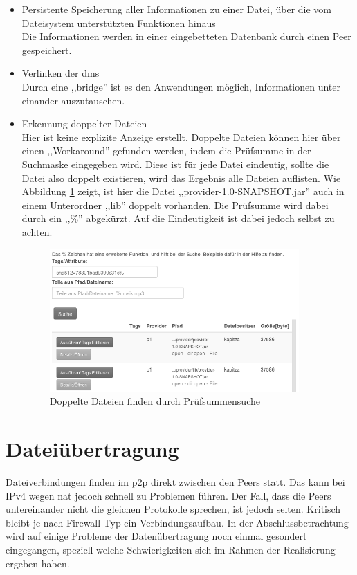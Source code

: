 \documentclass[oneside, ngerman, toc=bibliography,bibliography=totoc,listof=entryprefix, open=right,numbers=noenddot,fontsize=12pt]{scrbook}
\begin{document}
\begin{itemize}
         
      \item Persistente Speicherung aller Informationen zu einer Datei, über die vom Dateisystem unterstützten Funktionen hinaus\\
      Die Informationen werden in einer eingebetteten Datenbank durch einen Peer gespeichert.
    \item Verlinken der \acrshort{dms}\\
    Durch eine ,,bridge'' ist es den Anwendungen möglich, Informationen unter einander auszutauschen. 
    \item Erkennung doppelter Dateien\\
    Hier ist keine explizite Anzeige erstellt. Doppelte Dateien können hier über einen ,,Workaround'' gefunden werden, indem die Prüfsumme in der Suchmaske eingegeben wird. Diese ist für jede Datei eindeutig, sollte die Datei also doppelt existieren, wird das Ergebnis alle Dateien auflisten. Wie Abbildung \ref{fig:app-dups} zeigt, ist hier die Datei ,,provider-1.0-SNAPSHOT.jar'' auch in einem Unterordner ,,lib'' doppelt vorhanden. Die Prüfsumme wird dabei durch ein ,,\%'' abgekürzt. Auf die Eindeutigkeit ist dabei jedoch selbst zu achten. 
    
    \begin{figure}[htbp] 
        \centering
        \includegraphics[width=0.9\textwidth]{Masterarbeit_Bilder/suchedups.png}
        \caption{Doppelte Dateien finden durch Prüfsummensuche}
        \label{fig:app-dups}
    \end{figure}  
    
    
    
\end{itemize}



\section{Dateiübertragung}
Dateiverbindungen finden im \acrshort{p2p} direkt zwischen den Peers statt.
Das kann bei IPv4 wegen \acrshort{nat} jedoch schnell zu Problemen führen. Der Fall, dass die Peers untereinander nicht die gleichen Protokolle sprechen, ist jedoch selten. Kritisch bleibt je nach Firewall-Typ ein Verbindungsaufbau. In der Abschlussbetrachtung wird auf einige Probleme der Datenübertragung noch einmal gesondert eingegangen, speziell welche Schwierigkeiten sich im Rahmen der Realisierung ergeben haben.
\end{document}
